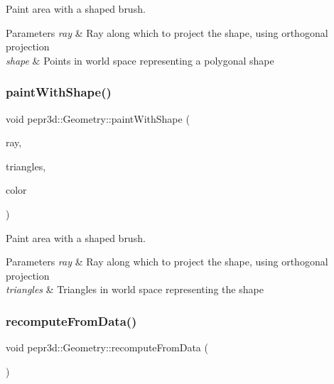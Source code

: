 Paint area with a shaped brush. 


\begin{DoxyParams}{Parameters}
{\em ray} & Ray along which to project the shape, using orthogonal projection \\
\hline
{\em shape} & Points in world space representing a polygonal shape \\
\hline
\end{DoxyParams}
\mbox{\label{classpepr3d_1_1_geometry_a152673dacbe299a55ee9dc6a2403d6a5}} 
\subsubsection{\texorpdfstring{paintWithShape()}{paintWithShape()}\hspace{0.1cm}{\footnotesize\ttfamily [2/2]}}
{\footnotesize\ttfamily void pepr3d\+::\+Geometry\+::paint\+With\+Shape (\begin{DoxyParamCaption}\item[{const ci\+::\+Ray \&}]{ray,  }\item[{const std\+::vector$<$ Data\+Triangle\+::\+Triangle $>$ \&}]{triangles,  }\item[{size\+\_\+t}]{color }\end{DoxyParamCaption})}



Paint area with a shaped brush. 


\begin{DoxyParams}{Parameters}
{\em ray} & Ray along which to project the shape, using orthogonal projection \\
\hline
{\em triangles} & Triangles in world space representing the shape \\
\hline
\end{DoxyParams}
\mbox{\label{classpepr3d_1_1_geometry_a7671cab77f226a80cbea5703aba2026c}} 
\subsubsection{\texorpdfstring{recomputeFromData()}{recomputeFromData()}}
{\footnotesize\ttfamily void pepr3d\+::\+Geometry\+::recompute\+From\+Data (\begin{DoxyParamCaption}{ }\end{DoxyParamCaption})}

